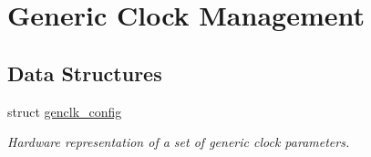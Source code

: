 \hypertarget{group__genclk__group}{
\section{\-Generic \-Clock \-Management}
\label{group__genclk__group}
}
\subsection*{\-Data \-Structures}
\begin{DoxyCompactItemize}
\item 
struct \hyperlink{structgenclk__config}{genclk\-\_\-config}
\begin{DoxyCompactList}\small\item\em \-Hardware representation of a set of generic clock parameters. \end{DoxyCompactList}\end{DoxyCompactItemize}
